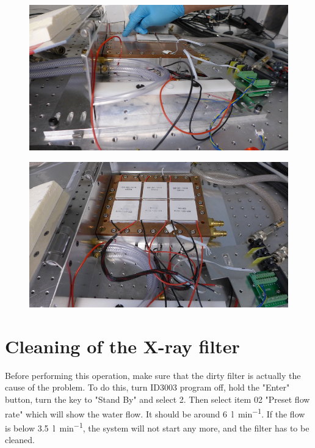\documentclass[a4paper,12pt,twoside]{article}
\begin{document}
\begin{appendices}
\begin{figure} [h!]
\centering
\begin{minipage}{.48\textwidth}
  \centering
  \includegraphics[width=\textwidth]{./Figures/Point9a.png}
  \label{Step9a}
\end{minipage}%
\hspace{2mm}
\begin{minipage}{.48\textwidth}
  \centering
  \includegraphics[width=\textwidth]{./Figures/Point9b.png}
  \label{Step9b}
\end{minipage}
\end{figure}
\clearpage
\newpage
\section{Cleaning of the X-ray filter} \label{Filter}

Before performing this operation, make sure that the dirty filter is actually the cause of the problem. To do this, turn ID3003 program off, hold the "Enter" button, turn the key to "Stand By" and select 2. Then select item 02 "Preset flow rate" which will show the water flow. It should be around \SI{6}{\litre\per\minute}. If the flow is below \SI{3.5}{\litre\per\minute}, the system will not start any more, and the filter has to be cleaned.
\\


\end{appendices}
\end{document}
